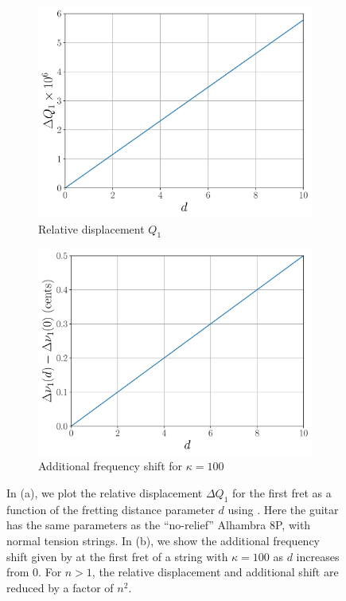  \begin{figure}
  \centering
  \begin{subfigure}[b]{0.8\textwidth}
   \centering
   \includegraphics[width=5.0in]{../figures/fret_disp}
   \caption{Relative displacement $Q_1$}
   \label{fig:fret_disp}
  \end{subfigure}
  \par\vspace{0.25in}
  \begin{subfigure}[b]{0.8\textwidth}
   \centering
   \includegraphics[width=5.0in]{../figures/fret_shift}
   \caption{Additional frequency shift for $\kappa = 100$}
   \label{fig:fret_shift}
  \end{subfigure}
  \caption{\label{fig:fret_model} In (a), we plot the relative displacement $\Delta Q_1$ for the first fret as a function of the fretting distance parameter $d$ using . Here the guitar has the same parameters as the ``no-relief'' Alhambra 8P, with normal tension strings. In (b), we show the additional frequency shift given by  at the first fret of a string with $\kappa = 100$ as $d$ increases from 0. For $n > 1$, the relative displacement and additional shift are reduced by a factor of $n^2$.}
 \end{figure}
